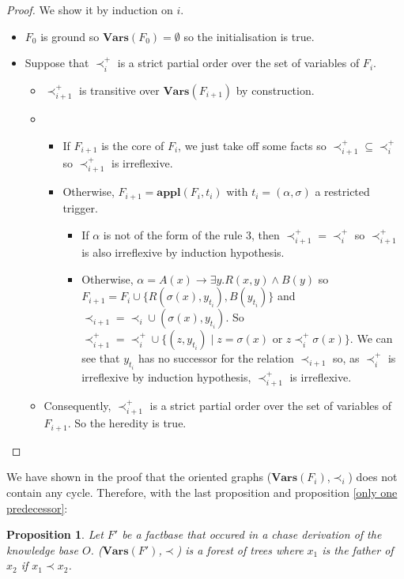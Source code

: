 \documentclass{article}
\newtheorem{proposition}{Proposition}[section]
\theoremstyle{definition}
\theoremstyle{remark}
\newcommand{\Vars}{\textbf{Vars}}
\newcommand{\Appl}{\textbf{appl}}
\begin{document}
\begin{proof}
We show it by induction on $i$.
\begin{itemize}
\item $F_0$ is ground so $\Vars(F_0) = \emptyset$ so the initialisation is true.
\item Suppose that $\prec^+_i$ is a strict partial order over the set of variables of $F_i$.
\begin{itemize}
\item $\prec^+_{i+1}$ is transitive over $\Vars(F_{i+1})$ by construction.
\item 
\begin{itemize}
\item If $F_{i+1}$ is the core of $F_i$, we just take off some facts so $\prec^+_{i+1} \subseteq \prec^+_{i}$  so $\prec^+_{i+1}$ is irreflexive.
\item Otherwise, $F_{i+1}= \Appl(F_{i},t_i)$ with $t_i = (\alpha,\sigma)$ a restricted trigger. 
\begin{itemize}
\item If $\alpha$ is not of the form of the rule $3$, then $\prec^+_{i+1} = \prec^+_{i}$  so $\prec^+_{i+1}$ is also irreflexive by induction hypothesis.
\item Otherwise, $\alpha = A(x) \rightarrow \exists y.R(x,y) \wedge B(y)$ so $F_{i+1} = F_i \cup \{R(\sigma(x),y_{t_i}),B(y_{t_i})\}$ and $\prec_{i+1} =\prec_i \cup (\sigma(x),y_{t_i})$. So $\prec^+_{i+1} = \prec^+_{i} \cup \{(z,y_{t_i}) \mid z = \sigma(x)$ or $z \prec_i^+ \sigma(x)\}$. We can see that $y_{t_i}$ has no successor for the relation $\prec_{i+1}$ so, as $\prec^+_i$ is irreflexive by induction hypothesis, $\prec^+_{i+1}$ is irreflexive.
\end{itemize}
\end{itemize}

\item Consequently, $\prec^+_{i+1}$ is a strict partial order over the set of variables of $F_{i+1}$. So the heredity is true.
\end{itemize}
\end{itemize}
\end{proof}

We have shown in the proof that the oriented graphs ($\Vars(F_i)$,$\prec_i$) does not contain any cycle. Therefore, with the last proposition and proposition \ref{only one predecessor}: 

\begin{proposition}
Let $F'$ be a factbase that occured in a chase derivation of the knowledge base $O$. ($\Vars(F')$,$\prec$) is a forest of trees where $x_1$ is the father of $x_2$ if $x_1 \prec x_2$.
\end{proposition}
\end{document}
